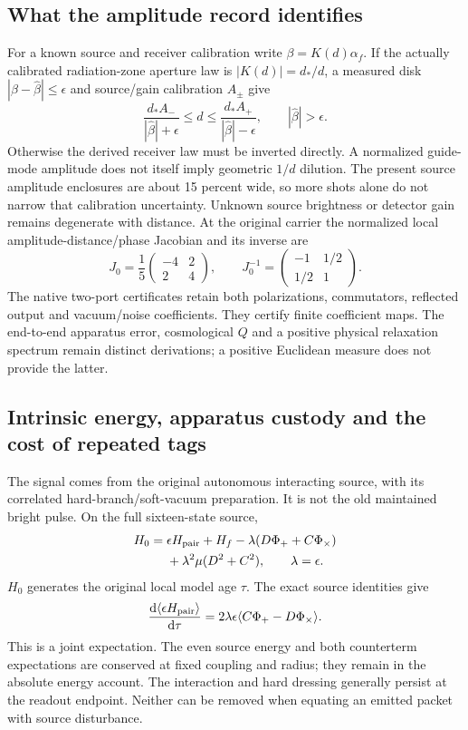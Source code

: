 \documentclass[10pt,twocolumn,letterpaper]{article}
\newcommand{\dd}{\mathrm{d}}
\begin{document}
\subsection{What the amplitude record identifies}
For a known source and receiver calibration write
$\beta=K(d)\alpha_f$.  If the actually calibrated radiation-zone aperture law
is $|K(d)|=d_*/d$, a measured disk $|\beta-\widehat\beta|\leq\epsilon$ and
source/gain calibration $A_\pm$ give
\[
 \frac{d_*A_-}{|\widehat\beta|+\epsilon}
 \leq d\leq
 \frac{d_*A_+}{|\widehat\beta|-\epsilon},\qquad
 |\widehat\beta|>\epsilon.
\]
Otherwise the derived receiver law must be inverted directly.  A normalized
guide-mode amplitude does not itself imply geometric $1/d$ dilution.  The
present source amplitude enclosures are about 15 percent wide, so more
shots alone do not narrow that calibration uncertainty.  Unknown source
brightness or detector gain remains degenerate with distance.
At the original carrier the normalized local amplitude-distance/phase
Jacobian and its inverse are
\[
 J_0=\frac15\begin{pmatrix}-4&2\\2&4\end{pmatrix},
 \qquad J_0^{-1}=\begin{pmatrix}-1&1/2\\1/2&1\end{pmatrix}.
\]
The native two-port certificates retain both polarizations, commutators,
reflected output and vacuum/noise coefficients.  They certify finite
coefficient maps.  The end-to-end apparatus error, cosmological $Q$ and a
positive physical relaxation spectrum remain distinct derivations; a
positive Euclidean measure does not provide the latter.

\subsection{Intrinsic energy, apparatus custody and the cost of repeated tags}
The signal comes from the original autonomous interacting source, with
its correlated hard-branch/soft-vacuum preparation. It is not the old
maintained bright pulse. On the full sixteen-state source,
\begin{equation}
 \begin{split}
 H_0={}&\epsilon H_{\rm pair}+H_f
       -\lambda(D\Phi_++C\Phi_\times)\\
       &+\lambda^2\mu(D^2+C^2),\qquad \lambda=\epsilon .
 \end{split}
\end{equation}
$H_0$ generates the original local model age $\tau$. The exact source
identities give
\begin{equation}
 \frac{\dd\langle\epsilon H_{\rm pair}\rangle}{\dd\tau}
   =2\lambda\epsilon\langle C\Phi_+-D\Phi_\times\rangle .
\end{equation}
This is a joint expectation. The even source energy and both counterterm
expectations are conserved at fixed coupling and radius; they remain in
the absolute energy account. The interaction and hard dressing generally
persist at the readout endpoint. Neither can be removed when equating
an emitted packet with source disturbance.
\end{document}
